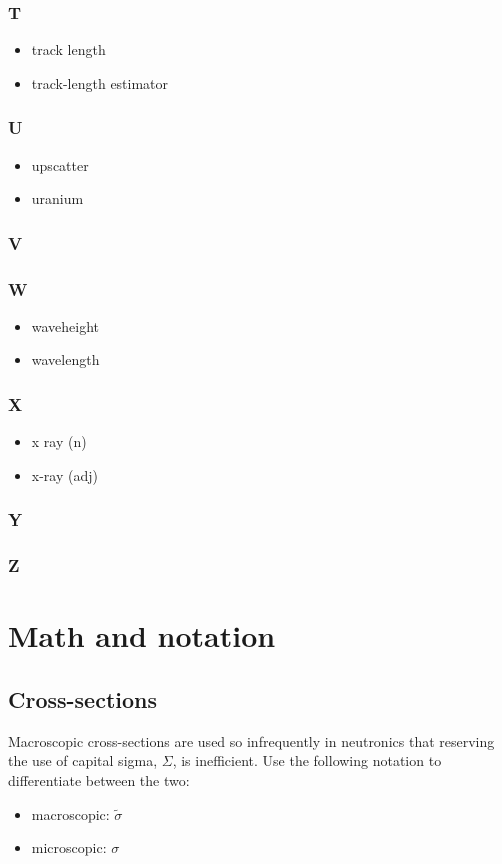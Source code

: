 \documentclass[10pt, letter]{article}
\begin{document}
\begin{multicols}{2}
\subsubsection*{T}
\begin{itemize}
\item track length
\item track-length estimator
\end{itemize}
\subsubsection*{U}
\begin{itemize}
\item upscatter
\item uranium
\end{itemize}
\subsubsection*{V}
\subsubsection*{W}
\begin{itemize}
\item waveheight
\item wavelength
\end{itemize}

\subsubsection*{X}
\begin{itemize}
\item x ray (n) 
\item x-ray (adj)
\end{itemize}
\subsubsection*{Y}
\subsubsection*{Z}

\pagebreak

\section{Math and notation}\label{sec:math}

\subsection{Cross-sections}
Macroscopic cross-sections are used so infrequently in neutronics that
reserving the use of capital sigma, $\Sigma$, is inefficient. Use the
following notation to differentiate between the two:
\begin{itemize}
\item macroscopic: $\tilde{\sigma}$
\item microscopic: $\sigma$
\end{itemize}


\end{multicols}
\end{document}
